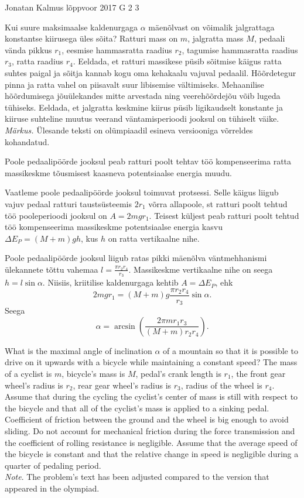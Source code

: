 {Jonatan Kalmus} %
{lõppvoor} %
{2017} %
{G 2} %
{3} %
{
\ifStatement
Kui suure maksimaalse kaldenurgaga $\alpha$ mäenõlvast on võimalik jalgrattaga konstantse kiirusega üles sõita? Ratturi mass on $m$, jalgratta mass $M$, pedaali vända pikkus $r_1$, eesmise hammasratta raadius $r_2$, tagumise hammasratta raadius $r_3$, ratta raadius $r_4$. Eeldada, et ratturi massikese püsib sõitmise käigus ratta suhtes paigal ja sõitja kannab kogu oma kehakaalu vajuval pedaalil. Hõõrdetegur pinna ja ratta vahel on piisavalt suur libisemise vältimiseks. Mehaanilise hõõrdumisega jõuülekandes mitte arvestada ning veerehõõrdejõu võib lugeda tühiseks. Eeldada, et jalgratta keskmine kiirus püsib ligikaudselt konstante ja kiiruse suhteline muutus veerand väntamisperioodi jooksul on tühiselt väike.\\
\emph{Märkus.} Ülesande teksti on olümpiaadil esineva versiooniga võrreldes kohandatud.
\fi


\ifHint
Poole pedaalipöörde jooksul peab ratturi poolt tehtav töö kompenseerima ratta massikeskme tõusmisest kaasneva potentsiaalse energia muudu.
\fi


\ifSolution
Vaatleme poole pedaalipöörde jooksul toimuvat protsessi. Selle käigus liigub vajuv pedaal ratturi taustsüsteemis $2r_1$ võrra allapoole, st ratturi poolt tehtud töö pooleperioodi jooksul on $A = 2mgr_1$. Teisest küljest peab ratturi poolt tehtud töö kompenseerima massikeskme potentsiaalse energia kasvu $\Delta E_P = (M + m)gh$, kus $h$ on ratta vertikaalne nihe. 

Poole pedaalipöörde jooksul liigub ratas pikki mäenõlva väntmehhanismi ülekannete tõttu vahemaa $l=\frac{\pi r_2 r_4}{r_3}$. Massikeskme vertikaalne nihe on seega $h = l\sin\alpha$. Niisiis, kriitilise kaldenurgaga kehtib $A = \Delta E_P$, ehk
\[
2mgr_1 = (M + m)g\frac{\pi r_2r_4}{r_3}\sin\alpha.
\]
Seega
\[
\alpha = \arcsin\left(\frac{2\pi mr_1r_3}{(M + m)r_2r_4}\right).
\]
\fi


\ifEngStatement
What is the maximal angle of inclination $\alpha$ of a mountain so that it is possible to drive on it upwards with a bicycle while maintaining a constant speed? The mass of a cyclist is $m$, bicycle’s mass is $M$, pedal’s crank length is $r_1$, the front gear wheel’s radius is $r_2$, rear gear wheel’s radius is $r_3$, radius of the wheel is $r_4$. Assume that during the cycling the cyclist’s center of mass is still with respect to the bicycle and that all of the cyclist’s mass is applied to a sinking pedal. Coefficient of friction between the ground and the wheel is big enough to avoid sliding. Do not account for mechanical friction during the force transmission and the coefficient of rolling resistance is negligible. Assume that the average speed of the bicycle is constant and that the relative change in speed is negligible during a quarter of pedaling period.\\
\emph{Note}. The problem’s text has been adjusted compared to the version that appeared in the olympiad.
\fi


}
